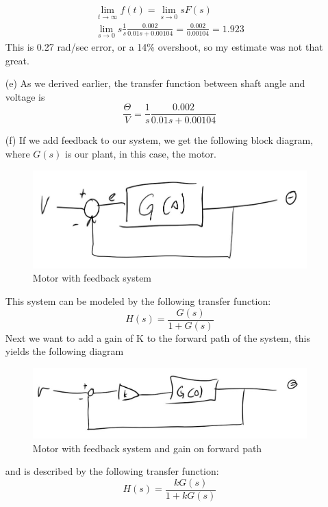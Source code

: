 \documentclass{article}
\begin{document}
\begin{itemize}
    \begin{eqnarray}
        \lim_{t\to\infty} f(t) = \lim_{s\to0}s F(s)\\
        \lim_{s\to0}s \frac{1}{s}\frac{0.002}{0.01s + 0.00104} = \frac{0.002}{0.00104} = 1.923
    \end{eqnarray}
    This is 0.27 rad/sec error, or a 14\% overshoot, so my estimate was not that great.
    \item[(e)] As we derived earlier, the transfer function between shaft angle and voltage is $$\frac{\Theta}{V} = \frac{1}{s}\frac{0.002}{0.01s + 0.00104}$$
    \item[(f)] If we add feedback to our system, we get the following block diagram, where $G(s)$ is our plant, in this case, the motor.
    \begin{figure}[!htb]
        \centering
        \includegraphics[width=.8\linewidth]{blockf1.JPG}
        \caption{Motor with feedback system}
        \label{fig:f1}
    \end{figure}
    This system can be modeled by the following transfer function:
    $$H(s) = \frac{G(s)}{1+G(s)}$$
    Next we want to add a gain of K to the forward path of the system, this yields the following diagram
    \begin{figure}[!htb]
        \centering
        \includegraphics[width=.8\linewidth]{blockf2.JPG}
        \caption{Motor with feedback system and gain on forward path}
        \label{fig:f2}
    \end{figure}
    and is described by the following transfer function:
    $$H(s) = \frac{kG(s)}{1+kG(s)}$$


\end{itemize}
\end{document}

